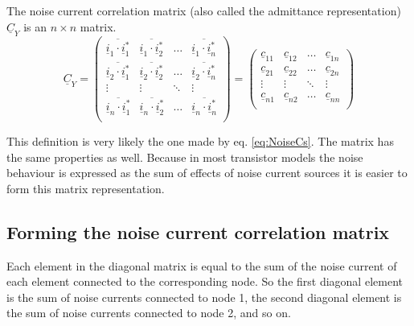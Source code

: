 The noise current correlation matrix (also called the admittance
representation) $\underline{C}_Y$ is an $n \times n$ matrix.
\begin{equation}
\underline{C}_Y =
\begin{pmatrix}
\overline{\underline{i}_{1}\cdot \underline{i}_{1}^*} &
    \overline{\underline{i}_{1}\cdot \underline{i}_{2}^*} &
    \ldots & \overline{\underline{i}_{1}\cdot \underline{i}_{n}^*}\\
 \overline{\underline{i}_{2}\cdot \underline{i}_{1}^*} &
    \overline{\underline{i}_{2}\cdot \underline{i}_{2}^*} & \ldots &
    \overline{\underline{i}_{2}\cdot \underline{i}_{n}^*}\\
 \vdots & \vdots & \ddots & \vdots\\
 \overline{\underline{i}_{n}\cdot \underline{i}_{1}^*} &
    \overline{\underline{i}_{n}\cdot \underline{i}_{2}^*} &
    \ldots & \overline{\underline{i}_{n}\cdot \underline{i}_{n}^*}\\
\end{pmatrix}
=
\begin{pmatrix}
  \underline{c}_{11} & \underline{c}_{12} & \ldots & \underline{c}_{1n}\\
  \underline{c}_{21} & \underline{c}_{22} & \ldots & \underline{c}_{2n}\\
  \vdots & \vdots & \ddots & \vdots\\
  \underline{c}_{n1} & \underline{c}_{n2} & \ldots & \underline{c}_{nn}\\
\end{pmatrix}
\end{equation}

This definition is very likely the one made by eq. \eqref{eq:NoiseCs}.
The matrix has the same properties as well.  Because in most
transistor models the noise behaviour is expressed as the sum of
effects of noise current sources it is easier to form this matrix
representation.

\subsection{Forming the noise current correlation matrix}

Each element in the diagonal matrix is equal to the sum of the noise
current of each element connected to the corresponding node.  So the
first diagonal element is the sum of noise currents connected to node
1, the second diagonal element is the sum of noise currents connected
to node 2, and so on.


